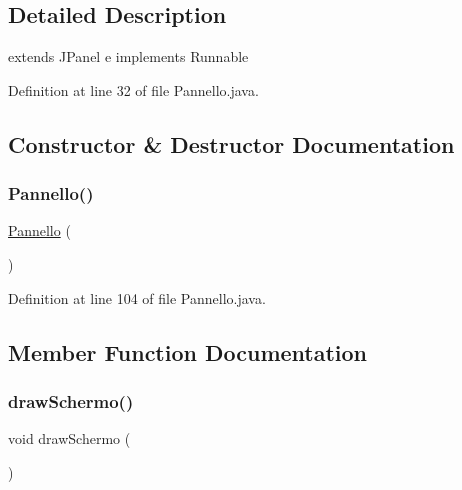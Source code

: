 \subsection{Detailed Description}
extends J\+Panel e implements Runnable 

Definition at line 32 of file Pannello.\+java.



\subsection{Constructor \& Destructor Documentation}
\mbox{\label{classa_1_1survival_1_1game_1_1_pannello_ab70bbeb2810224fb9e495d09a0b78ede}} 
\subsubsection{\texorpdfstring{Pannello()}{Pannello()}}
{\footnotesize\ttfamily \hyperlink{classa_1_1survival_1_1game_1_1_pannello}{Pannello} (\begin{DoxyParamCaption}{ }\end{DoxyParamCaption})}



Definition at line 104 of file Pannello.\+java.



\subsection{Member Function Documentation}
\mbox{\label{classa_1_1survival_1_1game_1_1_pannello_ab07487900bba57d73694e694968a1993}} 
\subsubsection{\texorpdfstring{draw\+Schermo()}{drawSchermo()}}
{\footnotesize\ttfamily void draw\+Schermo (\begin{DoxyParamCaption}{ }\end{DoxyParamCaption})}



